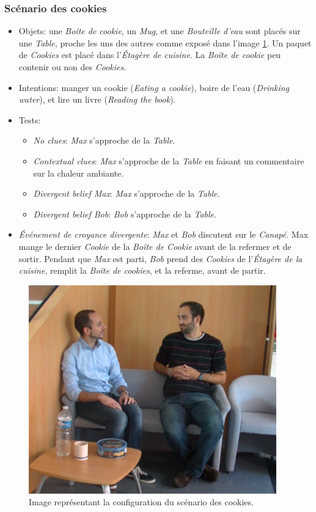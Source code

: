 \documentclass[a4paper,11pt,twoside]{StyleThese}
\begin{document}
\subsubsection{Scénario des cookies}
\begin{itemize}
\item Objets: une \textit{Boîte de cookie}, un \textit{Mug}, et une \textit{Bouteille d'eau} sont placés sur une \textit{Table}, proche les uns des autres comme exposé dans l'image \ref{fig:cookieScen}. Un paquet de \textit{Cookies} est placé dans l'\textit{Étagère de cuisine}. La \textit{Boîte de cookie} peu contenir ou non des \textit{Cookies}.
\item Intentions: manger un cookie (\textit{Eating a cookie}), boire de l'eau (\textit{Drinking water}), et lire un livre (\textit{Reading the book}).
\item Tests:
\begin{itemize}
	\item \textit{No clues}: \textit{Max} s'approche de la \textit{Table}.
    \item \textit{Contextual clues}: \textit{Max} s'approche de la \textit{Table} en faisant un commentaire sur la chaleur ambiante.
	\item \textit{Divergent belief Max}: \textit{Max} s'approche de la \textit{Table}.
	\item \textit{Divergent belief Bob}: \textit{Bob} s'approche de la \textit{Table}.
\end{itemize}
\item  \textit{Événement de croyance divergente}:  \textit{Max} et \textit{Bob} discutent sur le \textit{Canapé}. Max mange le dernier \textit{Cookie} de la \textit{Boîte de Cookie} avant de la refermer et de sortir. Pendant que \textit{Max} est parti, \textit{Bob} prend des \textit{Cookies} de l'\textit{Étagère de la cuisine}, remplit la \textit{Boîte de cookies}, et la referme, avant de partir.
\end{itemize}

\begin{figure}[ht!]
  \centering
 \includegraphics[width=0.7\linewidth]{./intention/actors.png} 
  \caption {Image représentant la configuration du scénario des cookies.}
  \label{fig:cookieScen}
\end{figure}
\end{document}
